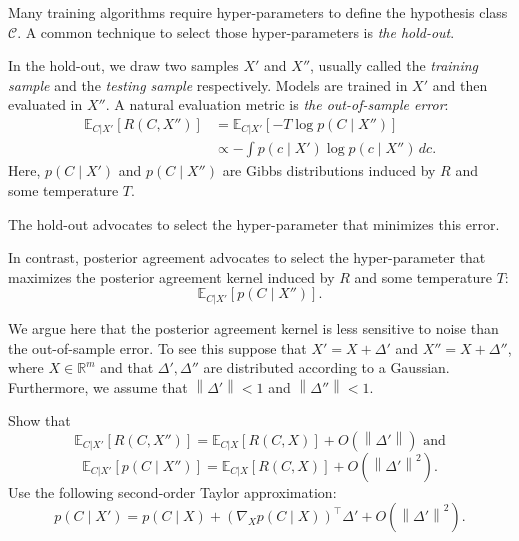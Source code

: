 Many training algorithms require hyper-parameters to define the hypothesis class $\mathcal{C}$. A common technique to select those hyper-parameters is \emph{the hold-out}. 

In the hold-out, we draw two samples $X'$ and $X''$, usually called the \emph{training sample} and the \emph{testing sample} respectively. Models are trained in $X'$ and then evaluated in $X''$. A natural evaluation metric is \emph{the out-of-sample error}:
%
\begin{align}
\mathbb{E}_{C | X'}\left[R(C, X'')\right] &= \mathbb{E}_{C | X'}\left[- T \log p(C \mid X'')\right]\\ 
&\propto - \int p(c \mid X') \log p(c \mid X'') \, dc.
\end{align}
%
Here, $p(C \mid X')$ and $p(C \mid X'')$ are Gibbs distributions induced by $R$ and some temperature $T$.

The hold-out advocates to select the hyper-parameter that minimizes this error.

In contrast, posterior agreement advocates to select the hyper-parameter that maximizes the posterior agreement kernel induced by $R$ and some temperature $T$:
%
\begin{equation}
\mathbb{E}_{C | X'}\left[p(C \mid X'')\right].
\end{equation}

We argue here that the posterior agreement kernel is less sensitive to noise than the out-of-sample error. To see this suppose that $X' = X + \Delta'$ and $X'' = X + \Delta''$, where $X \in \mathbb{R}^m$ and that $\Delta', \Delta''$ are distributed according to a Gaussian. Furthermore, we assume that $\left\|\Delta'\right\| < 1$ and $\left\|\Delta''\right\| < 1$. 

\begin{exercise} Show that
%
\begin{equation}
\mathbb{E}_{C | X'}[R(C, X'')] = \mathbb{E}_{C | X}[R(C, X)] + O(\left\|\Delta'\right\|) \text{ and}
\end{equation}
%
\begin{equation}
\mathbb{E}_{C | X'}[p(C \mid X'')] = \mathbb{E}_{C | X}[R(C, X)] + O(\left\|\Delta'\right\|^2).
\end{equation}
%
Use the following second-order Taylor approximation:
%
\begin{equation}
p(C \mid X') = p(C \mid X) + \left(\nabla_{X}p(C\mid X)\right)^\top \Delta' + O(\left\|\Delta'\right\|^2).
\end{equation}
%
\end{exercise}
%

